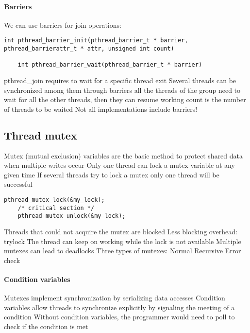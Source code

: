 \paragraph*{Barriers}
We can use barriers for join operations: 
\begin{lstlisting}[style=C]
    int pthread_barrier_init(pthread_barrier_t * barrier, pthread_barrierattr_t * attr, unsigned int count)

    int pthread_barrier_wait(pthread_barrier_t * barrier)
\end{lstlisting}
pthread_join requires to wait for a specific
thread exit
Several threads can be synchronized among them
through barriers
all the threads of the group need to wait for all
the other threads, then they can resume
working
count is the number of threads to be waited
Not all implementations include barriers!

\subsection{Thread mutex}
Mutex (mutual exclusion) variables are the basic
method to protect shared data when multiple
writes occur
Only one thread can lock a mutex variable at any
given time
If several threads try to lock a mutex only one
thread will be successful
\begin{lstlisting}[style=C]
    pthread_mutex_lock(&my_lock);
    /* critical section */
    pthread_mutex_unlock(&my_lock);
\end{lstlisting}
Threads that could not acquire the mutex are
blocked
Less blocking overhead: trylock
The thread can keep on working while the lock
is not available
Multiple mutexes can lead to deadlocks
Three types of mutexes:
Normal
Recursive
Error check

\paragraph*{Condition variables}
Mutexes implement synchronization by serializing
data accesses
Condition variables allow threads to synchronize
explicitly by signaling the meeting of a condition
Without condition variables, the programmer
would need to poll to check if the condition is met